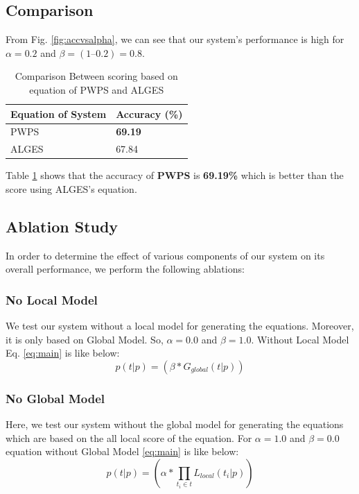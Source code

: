 \documentclass[document.tex]{subfiles}
\begin{document}
\subsection{Comparison}
From Fig. \ref{fig:accvsalpha}, we can see that our system’s performance is high for $\alpha = 0.2$ and $\beta  = (1 – 0.2) = 0.8$.
\begin{table}[H]
	\caption{Comparison Between scoring based on equation of PWPS and ALGES}
	\begin{center}
		\begin{tabular}{|l|l|}
			\hline
			Equation of System & Accuracy (\%)\\
			\hline
			PWPS & \textbf{69.19}\\
			ALGES & 67.84\\
			\hline
		\end{tabular}
	\end{center}
	\label{tab:comp}
\end{table}


Table \ref{tab:comp} shows that the accuracy of \textbf{PWPS} is \textbf{69.19\%} which is better than the score using ALGES’s equation.

\subsection{Ablation Study}
In order to determine the effect of various components of our system on its overall performance, we perform the following ablations:
\subsubsection{No Local Model}
We test our system without a local model for generating the equations. Moreover, it is only based on Global Model. So, $\alpha = 0.0$ and $\beta = 1.0$. Without Local Model Eq. \ref{eq:main} is like below:
\begin{equation}
	p(t|p) = (\beta * G_{global}(t|p))
	\label{eq:Noloc}
\end{equation}
\subsubsection{No Global Model}
Here, we test our system without the global model for generating the equations which are based on the all local score of the equation. For $\alpha = 1.0$ and $\beta = 0.0$ equation without Global Model \ref{eq:main} is like below:
\begin{equation}
	p(t|p) = (\alpha * \prod_{t_i \in t} L_{local}(t_i | p) ) 
	\label{eq:noGlob}
\end{equation}
\end{document}
